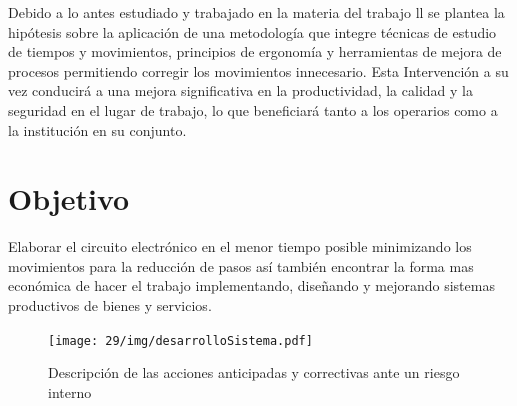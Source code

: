     Debido a lo antes estudiado y trabajado en la materia del trabajo ll se plantea la hipótesis sobre la aplicación de una metodología que integre técnicas de estudio de tiempos y movimientos, principios de ergonomía y herramientas de mejora de procesos permitiendo corregir los movimientos innecesario. Esta Intervención a su vez conducirá a una mejora significativa en la productividad, la calidad y la seguridad en el lugar de trabajo, lo que beneficiará tanto a los operarios  como a la institución en su conjunto.
    \section{Objetivo}
    
    
    
    Elaborar el circuito electrónico  en el menor tiempo posible minimizando los  movimientos para la reducción de pasos así también encontrar la forma mas económica de hacer el trabajo implementando, diseñando y mejorando sistemas productivos de bienes y servicios.
    \begin{figure}[H]
        \centering
        \texttt{[image: 29/img/desarrolloSistema.pdf]}
        \caption{Descripción de las acciones anticipadas y correctivas ante un riesgo interno }
        \label{fig:desarrolloSistema.pdf}
    \end{figure}
